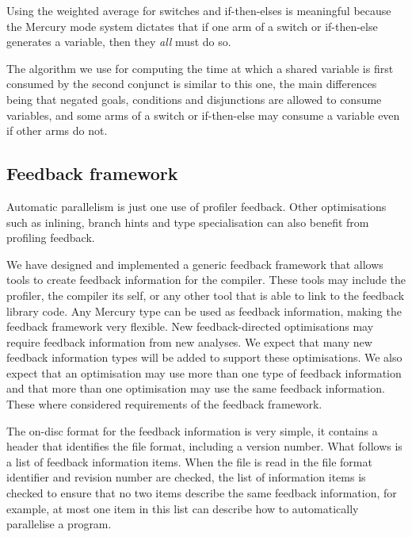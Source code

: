 \noindent
Using the weighted average for switches and if-then-elses is meaningful because
the Mercury mode system dictates
that if one arm of a switch or if-then-else generates a variable,
then they \emph{all} must do so.

The algorithm we use for computing the time
at which a shared variable is first consumed by the second conjunct
is similar to this one,
the main differences being that
negated goals, conditions and disjunctions are allowed to consume variables,
and some arms of a switch or if-then-else
may consume a variable even if other arms do not.


\subsection{Feedback framework}
\label{sec:feedback}

Automatic parallelism is just one use of profiler feedback.
Other optimisations
such as inlining,
branch hints
and type specialisation
can also benefit from profiling feedback.

We have designed and implemented a generic feedback framework that allows
tools to create feedback information for the compiler.
These tools may include the profiler, the compiler its self,
or any other tool that is able to link to the feedback library code.
Any Mercury type can be used as feedback information,
making the feedback framework very flexible.
New feedback-directed optimisations may require feedback information
from new analyses.
We expect that many new feedback information types will be added to
support these optimisations.
We also expect that an optimisation may use more than one type of
feedback information and that more than one optimisation may use the
same feedback information.
These where considered requirements of the feedback framework.

The on-disc format for the feedback information is very simple,
it contains a header that identifies the file format,
including a version number.
What follows is a list of feedback information items.
When the file is read in the file format identifier and revision
number are checked,
the list of information items is checked to ensure that no two items
describe the same feedback information,
for example,
at most one item in this list can describe how to automatically parallelise
a program.


